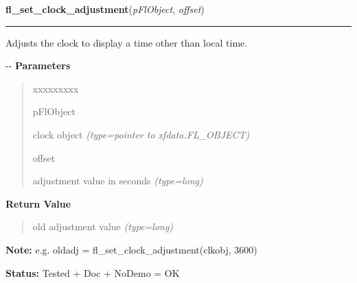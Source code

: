     \vspace{0.5ex}

\hspace{.8\funcindent}\begin{boxedminipage}{\funcwidth}

    \raggedright \textbf{fl\_set\_clock\_adjustment}(\textit{pFlObject}, \textit{offset})

    \vspace{-1.5ex}

    \rule{\textwidth}{0.5\fboxrule}
\setlength{\parskip}{2ex}

Adjusts the clock to display a time other than local time.

-{}-
\setlength{\parskip}{1ex}
      \textbf{Parameters}
      \vspace{-1ex}

      \begin{quote}
        \begin{Ventry}{xxxxxxxxx}

          \item[pFlObject]


clock object
            {\it (type=pointer to xfdata.FL\_OBJECT)}

          \item[offset]


adjustment value in seconds
            {\it (type=long)}

        \end{Ventry}

      \end{quote}

      \textbf{Return Value}
    \vspace{-1ex}

      \begin{quote}

old adjustment value
      {\it (type=long)}

      \end{quote}

\textbf{Note:} 
e.g. oldadj = fl\_set\_clock\_adjustment(clkobj, 3600)


\textbf{Status:} 
Tested + Doc + NoDemo = OK


    \end{boxedminipage}

    \label{xformslib:flclock:fl_set_clock_ampm}

